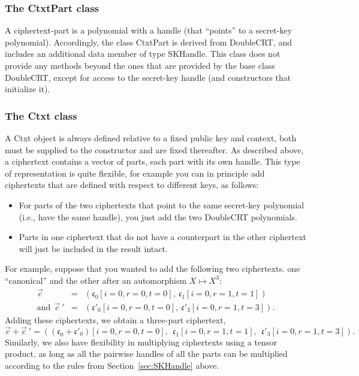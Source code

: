 \documentclass[14pt]{extarticle}
\newcommand{\secref}[1]{Section~\protect\ref{sec:#1}}
\def\DoubleCRT{\textsf{DoubleCRT}}
\def\Ctxt{\textsf{Ctxt}}
\def\SKHandle{\textsf{SKHandle}}
\def\CtxtPart{\textsf{CtxtPart}}
\def\vc{\vec{c}}
\newcommand{\ct}{\mathfrak{c}}
\begin{document}
\subsubsection{The {\CtxtPart} class}\label{sec:CtxtPart}
A ciphertext-part is a polynomial with a handle (that
``points'' to a secret-key polynomial). Accordingly, the class
{\CtxtPart} is derived from {\DoubleCRT}, and includes an additional
data member of type {\SKHandle}. This class does not provide any
methods beyond the ones that are provided by the base class
{\DoubleCRT}, except for access to the secret-key handle (and
constructors that initialize it).


\subsubsection{The {\Ctxt} class}
A {\Ctxt} object is always defined relative to a fixed public key and
context, both must be supplied to the constructor and are fixed
thereafter. As described above, a ciphertext contains a vector of
parts, each part with its own handle. This type of representation is
quite flexible, for example you can  in principle add ciphertexts
that are defined with respect to different keys, as follows:
\begin{itemize}
\item
For parts of the two ciphertexts that point to the same secret-key
polynomial (i.e., have the same handle), you just add the two
{\DoubleCRT} polynomials.
\item 
Parts in one ciphertext that do not have a counterpart in the other
ciphertext will just be included in the result intact.
\end{itemize}
For example, suppose that you wanted to add the following two
ciphertexts. one ``canonical'' and the other after an automorphism
$X\mapsto X^3$:
\begin{eqnarray*}
\vc\ &=& (\ct_0[i=0,r=0,t=0],~ \ct_1[i=0,r=1,t=1])\\
\mbox{and}~~\vc\ ' &=& (\ct'_0[i=0,r=0,t=0],~ \ct'_3[i=0,r=1,t=3]).
\end{eqnarray*}
Adding these ciphertexts, we obtain a three-part ciphertext,
\[
\vc+\vc\ ' = ((\ct_0+\ct'_0)[i=0,r=0,t=0],~~
            \ct_1[i=0,r=1,t=1],~~ \ct'_3[i=0,r=1,t=3]).
\]
Similarly, we also have flexibility in multiplying ciphertexts using
a tensor product, as long as all the pairwise handles of all the parts
can be multiplied according to the rules from \secref{SKHandle} above.
\end{document}
